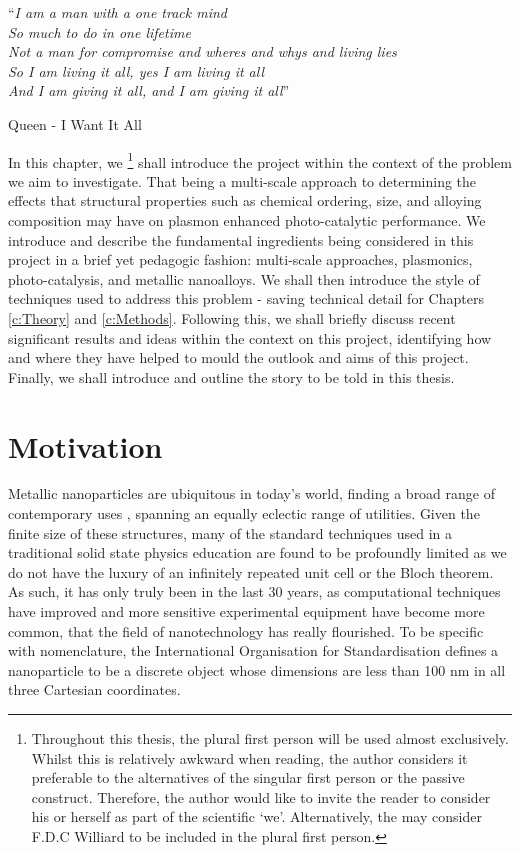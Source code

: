 \noindent\enquote{\itshape I am a man with a one track mind\\
    So much to do in one lifetime\\
    Not a man for compromise and wheres and whys and living lies\\
    So I am living it all, yes I am living it all\\
    And I am giving it all, and I am giving it all}\bigbreak

\hfill Queen - I Want It All

\vspace*{0.05\textheight}

In this chapter, we \footnote{Throughout this thesis, the plural first person will be used almost exclusively. Whilst this is relatively awkward when reading, the author considers it preferable to the alternatives of the singular first person or the passive construct. Therefore, the author would like to invite the reader to consider his or herself as part of the scientific `we'. Alternatively, the may consider F.D.C Williard to be included in the plural first person.} shall introduce the project within the context of the problem we aim to investigate. That being a multi-scale approach to determining the effects that structural properties such as chemical ordering, size, and alloying composition may have on plasmon enhanced photo-catalytic performance. We introduce and describe the fundamental ingredients being considered in this project in a brief yet pedagogic fashion: multi-scale approaches, plasmonics, photo-catalysis, and metallic nanoalloys. We shall then introduce the style of techniques used to address this problem - saving technical detail for Chapters \ref{c:Theory} and \ref{c:Methods}. Following this, we shall briefly discuss recent significant results and ideas within the context on this project, identifying how and where they have helped to mould the outlook and aims of this project. Finally, we shall introduce and outline the story to be told in this thesis.

\section{Motivation}
\label{Mot}
Metallic nanoparticles are ubiquitous in today's world, finding a broad range of contemporary uses \cite{BioSensors,PlasmonSensing2021,SolarToChem}, spanning an equally eclectic range of utilities. Given the finite size of these structures, many of the standard techniques used in a traditional solid state physics education are found to be profoundly limited as we do not have the luxury of an infinitely repeated unit cell or the Bloch theorem. As such, it has only truly been in the last 30 years, as computational techniques have improved and more sensitive experimental equipment have become more common, that the field of nanotechnology has really flourished. To be specific with nomenclature, the International Organisation for Standardisation defines a nanoparticle to be a discrete object whose dimensions are less than 100 nm in all three Cartesian coordinates.


